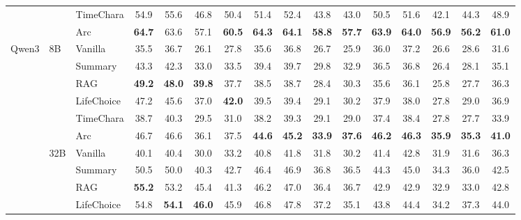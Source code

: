 \documentclass[11pt]{article}
\begin{document}
\begin{table}[t]
\begin{tabular}{lllccccccccccccc}
 &  & TimeChara & 54.9 & 55.6 & 46.8 & 50.4 & 51.4 & 52.4 & 43.8 & 43.0 & 50.5 & 51.6 & 42.1 & 44.3 & 48.9 \\
 &  & \cellcolor{yellow!15} Arc & \cellcolor{yellow!15} \textbf{64.7} & \cellcolor{yellow!15} 63.6 & \cellcolor{yellow!15} 57.1 & \cellcolor{yellow!15} \textbf{60.5} & \cellcolor{yellow!15} \textbf{64.3} & \cellcolor{yellow!15} \textbf{64.1} & \cellcolor{yellow!15} \textbf{58.8} & \cellcolor{yellow!15} \textbf{57.7} & \cellcolor{yellow!15} \textbf{63.9} & \cellcolor{yellow!15} \textbf{64.0} & \cellcolor{yellow!15} \textbf{56.9} & \cellcolor{yellow!15} \textbf{56.2} & \cellcolor{yellow!15} \textbf{61.0} \\
\midrule
\multirow[t]{12}{*}{Qwen3} & \multirow[t]{6}{*}{8B} & Vanilla & 35.5 & 36.7 & 26.1 & 27.8 & 35.6 & 36.8 & 26.7 & 25.9 & 36.0 & 37.2 & 26.6 & 28.6 & 31.6 \\
 &  & Summary & 43.3 & 42.3 & 33.0 & 33.5 & 39.4 & 39.7 & 29.8 & 32.9 & 36.5 & 36.8 & 26.4 & 28.1 & 35.1 \\
 &  & RAG & \textbf{49.2} & \textbf{48.0} & \textbf{39.8} & 37.7 & 38.5 & 38.7 & 28.4 & 30.3 & 35.6 & 36.1 & 25.8 & 27.7 & 36.3 \\
 &  & LifeChoice & 47.2 & 45.6 & 37.0 & \textbf{42.0} & 39.5 & 39.4 & 29.1 & 30.2 & 37.9 & 38.0 & 27.8 & 29.0 & 36.9 \\
 &  & TimeChara & 38.7 & 40.3 & 29.5 & 31.0 & 38.2 & 39.3 & 29.1 & 29.0 & 37.4 & 38.4 & 27.8 & 27.7 & 33.9 \\
 &  & \cellcolor{yellow!15} Arc & \cellcolor{yellow!15} 46.7 & \cellcolor{yellow!15} 46.6 & \cellcolor{yellow!15} 36.1 & \cellcolor{yellow!15} 37.5 & \cellcolor{yellow!15} \textbf{44.6} & \cellcolor{yellow!15} \textbf{45.2} & \cellcolor{yellow!15} \textbf{33.9} & \cellcolor{yellow!15} \textbf{37.6} & \cellcolor{yellow!15} \textbf{46.2} & \cellcolor{yellow!15} \textbf{46.3} & \cellcolor{yellow!15} \textbf{35.9} & \cellcolor{yellow!15} \textbf{35.3} & \cellcolor{yellow!15} \textbf{41.0} \\
\cmidrule(l){2-16}
 & \multirow[t]{6}{*}{32B} & Vanilla & 40.1 & 40.4 & 30.0 & 33.2 & 40.8 & 41.8 & 31.8 & 30.2 & 41.4 & 42.8 & 31.9 & 31.6 & 36.3 \\
 &  & Summary & 50.5 & 50.0 & 40.3 & 42.7 & 46.4 & 46.9 & 36.8 & 36.5 & 44.3 & 45.0 & 34.3 & 36.0 & 42.5 \\
 &  & RAG & \textbf{55.2} & 53.2 & 45.4 & 41.3 & 46.2 & 47.0 & 36.4 & 36.7 & 42.9 & 42.9 & 32.9 & 33.0 & 42.8 \\
 &  & LifeChoice & 54.8 & \textbf{54.1} & \textbf{46.0} & 45.9 & 46.8 & 47.8 & 37.2 & 35.1 & 43.8 & 44.4 & 34.2 & 37.3 & 44.0 \\

\end{tabular}
\end{table}
\end{document}
